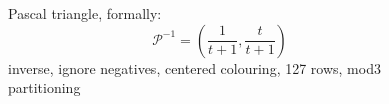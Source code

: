 
\begin{figure}[p]

    \noindent{}

    \captionsetup{singlelinecheck=off}
    \caption[.]{
        Pascal triangle, formally: 
        \begin{displaymath}
            \mathcal{P}^{-1}=\left(\frac{1}{t + 1}, \frac{t}{t + 1}\right)
        \end{displaymath} %
        inverse, ignore negatives, centered colouring, 127 rows, mod3 partitioning}

    \label{fig:pascal-inverse-ignore-negatives-centered-colouring-127-rows-mod3-partitioning-triangle}

\end{figure}
